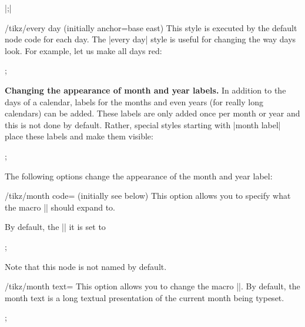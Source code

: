 \begin{command}{\calendar {}|;|}
    \begin{key}{/tikz/every day (initially anchor=base east)}
        This style is executed by the default node code for each day. The
        |every day| style is useful for changing the way days look. For
        example, let us make all days red:
\begin{codeexample}
\tikz[every day/.style=red]
  \calendar[dates=2000-01-01 to 2000-01-31,week list];
\end{codeexample}
    \end{key}


    \medskip
    \textbf{Changing the appearance of month and year labels.}
    In addition to the days of a calendar, labels for the months and even years
    (for really long calendars) can be added. These labels are only added once
    per month or year and this is not done by default. Rather, special styles
    starting with |month label| place these labels and make them visible:
\begin{codeexample}[]
\tikz \calendar[dates=2000-01-01 to 2000-02-last,week list,
                month label above centered];
\end{codeexample}

    The following options change the appearance of the month and year label:
    \begin{key}{/tikz/month code= (initially \normalfont see below)}
        This option allows you to specify what the macro |\tikzmonthcode|
        should expand to.

        By default, the |\tikzmonthcode| it is set to
\begin{codeexample}
;
\end{codeexample}
        Note that this node is not named by default.
    \end{key}

    \begin{key}{/tikz/month text=}
        This option allows you to change the macro |\tikzmonthtext|. By
        default, the month text is a long textual presentation of the current
        month being typeset.
\begin{codeexample}
\tikz \calendar[dates=2000-01-01 to 2000-01-31,week list,
                month label above centered,
                month text=\textcolor{red}{\%mt} \%y-];
\end{codeexample}
    \end{key}


\end{command}
